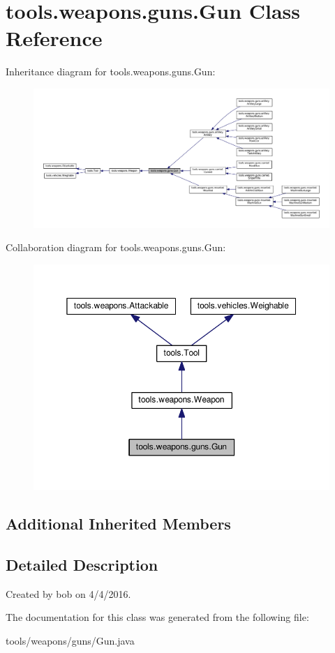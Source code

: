 \hypertarget{classtools_1_1weapons_1_1guns_1_1_gun}{}\section{tools.\+weapons.\+guns.\+Gun Class Reference}
\label{classtools_1_1weapons_1_1guns_1_1_gun}


Inheritance diagram for tools.\+weapons.\+guns.\+Gun\+:
\nopagebreak
\begin{figure}[H]
\begin{center}
\leavevmode
\includegraphics[width=350pt]{classtools_1_1weapons_1_1guns_1_1_gun__inherit__graph}
\end{center}
\end{figure}


Collaboration diagram for tools.\+weapons.\+guns.\+Gun\+:
\nopagebreak
\begin{figure}[H]
\begin{center}
\leavevmode
\includegraphics[width=350pt]{classtools_1_1weapons_1_1guns_1_1_gun__coll__graph}
\end{center}
\end{figure}
\subsection*{Additional Inherited Members}


\subsection{Detailed Description}
Created by bob on 4/4/2016. 

The documentation for this class was generated from the following file\+:\begin{DoxyCompactItemize}
\item 
tools/weapons/guns/Gun.\+java\end{DoxyCompactItemize}
